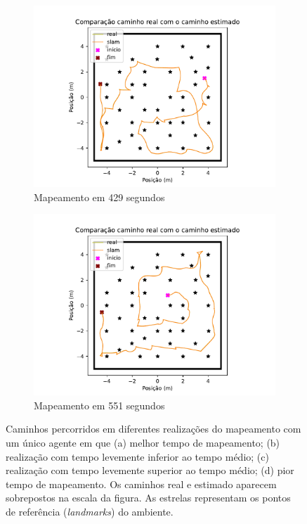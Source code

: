\begin{figure}
\begin{subfigure}{0.49\textwidth}
    \includegraphics[width=\textwidth]{figs/single-agent/rb1-path-medium-high.pdf} 
    \caption{Mapeamento em 429 segundos}
    \label{fig:single-agent-path-medium-high}
  \end{subfigure}
  \begin{subfigure}{0.49\textwidth}
    \includegraphics[width=\textwidth]{figs/single-agent/rb1-path-worst.pdf} 
    \caption{Mapeamento em 551 segundos}
    \label{fig:single-agent-path-worst}
  \end{subfigure}
  \caption[Caminhos percorridos durante mapeamento com um único agente]{Caminhos percorridos em diferentes realizações do mapeamento com um único agente em que (a) melhor tempo de mapeamento; (b) realização com tempo levemente inferior ao tempo médio; (c) realização com tempo levemente 
  superior ao tempo médio; (d) pior tempo de mapeamento. Os caminhos 
  real e estimado aparecem sobrepostos na escala da figura. As estrelas representam os pontos de referência (\textit{landmarks}) do ambiente.}
  \label{fig:single-agent-path}
\end{figure}

